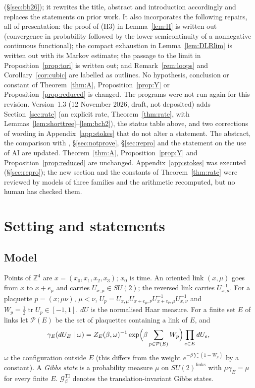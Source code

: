 \documentclass[11pt,a4paper]{article}
\theoremstyle{plain}
\theoremstyle{definition}
\theoremstyle{remark}
\numberwithin{equation}{section}
\newcommand{\Z}{\mathbb{Z}}
\newcommand{\tr}{\operatorname{tr}}
\newcommand{\cP}{\mathcal{P}}
\newcommand{\cG}{\mathcal{G}}
\begin{document}
\cite{BB26} (\S\ref{sec:bb26}); it rewrites the title, abstract and introduction accordingly and replaces the statements on prior work. It also incorporates
the following repairs, all of presentation: the proof of (H3) in Lemma~\ref{lem:H} is written out (convergence in probability followed by the lower semicontinuity of a nonnegative continuous functional); the compact exhaustion in
Lemma~\ref{lem:DLRlim} is written out with its Markov estimate; the passage to the limit in Proposition~\ref{prop:tori} is written out; and
Remark~\ref{rem:loops} and Corollary~\ref{cor:cubic} are labelled as outlines. No hypothesis, conclusion or constant of
Theorem~\ref{thm:A}, Proposition~\ref{prop:Y} or Proposition~\ref{prop:reduced} is changed. The programs were not run again for this revision.
Version~1.3 (12 November 2026, draft, not deposited) adds Section~\ref{sec:rate} (an explicit rate, Theorem~\ref{thm:rate}, with Lemmas~\ref{lem:shorttree}--\ref{lem:bch2}), the status table above,
and two corrections of wording in Appendix~\ref{app:stokes} that do not alter a statement. The abstract, the comparison with \cite{BB26}, \S\ref{sec:notprove},
\S\ref{sec:repro} and the statement on the use of AI are updated. Theorem~\ref{thm:A}, Proposition~\ref{prop:Y} and Proposition~\ref{prop:reduced} are unchanged.
Appendix~\ref{app:stokes} was executed (\S\ref{sec:repro}); the new section and the constants of Theorem~\ref{thm:rate} were reviewed by models of three families and the arithmetic recomputed, but no human has checked them.

\section{Setting and statements}\label{sec:setting}

\subsection{Model}
Points of $\Z^4$ are $x=(x_0,x_1,x_2,x_3)$; $x_0$ is time. An oriented link $(x,\mu)$ goes from $x$ to $x+e_\mu$ and carries
$U_{x,\mu}\in SU(2)$; the reversed link carries $U_{x,\mu}^{-1}$. For a plaquette $p=(x;\mu\nu)$, $\mu<\nu$,
$U_p=U_{x,\mu}U_{x+e_\mu,\nu}U_{x+e_\nu,\mu}^{-1}U_{x,\nu}^{-1}$ and $W_p=\frac12\tr U_p\in[-1,1]$. $dU$ is the normalised Haar measure.
For a finite set $E$ of links let $\cP(E)$ be the set of plaquettes containing a link of $E$, and
\begin{equation}\label{eq:spec}
\gamma_E(dU_E\mid\omega)=Z_E(\beta,\omega)^{-1}\exp\Bigl(\beta\sum_{p\in\cP(E)}W_p\Bigr)\prod_{e\in E}dU_e,
\end{equation}
$\omega$ the configuration outside $E$ (this differs from the weight $e^{-\beta\sum(1-W_p)}$ by a constant). A \emph{Gibbs state} is a
probability measure $\mu$ on $SU(2)^{\text{links}}$ with $\mu\gamma_E=\mu$ for every finite $E$. $\cG^{\mathrm{TI}}_\beta$ denotes the
translation-invariant Gibbs states.
\end{document}
